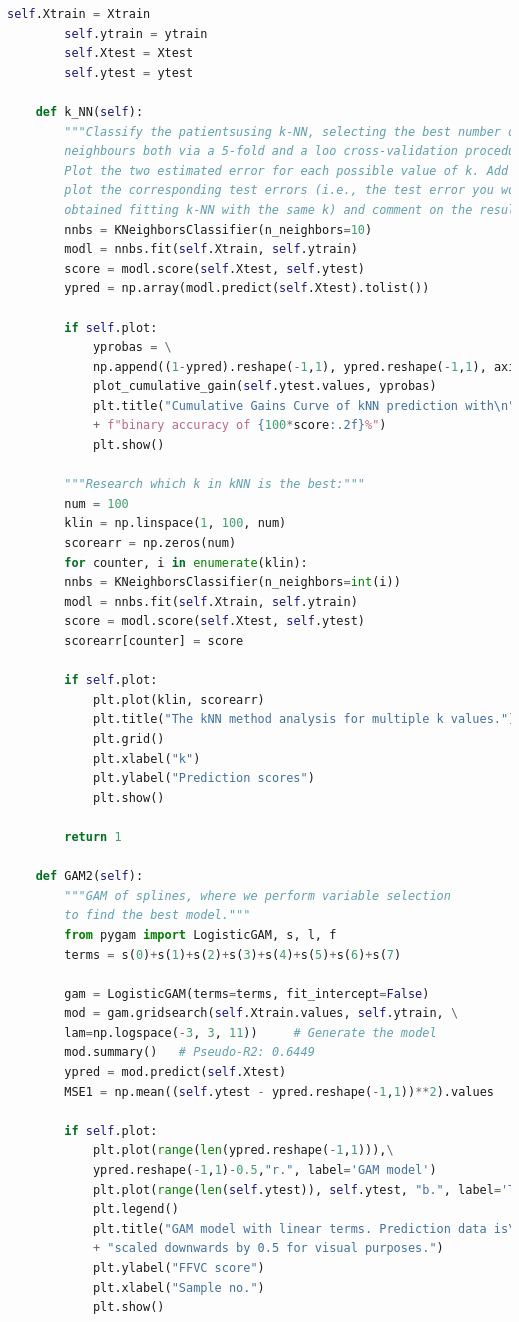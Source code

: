 \documentclass[]{article}
\begin{document}
\begin{lstlisting}[language=Python]
		self.Xtrain = Xtrain
		self.ytrain = ytrain
		self.Xtest = Xtest
		self.ytest = ytest
		
	def k_NN(self):
		"""Classify the patientsusing k-NN, selecting the best number of
		neighbours both via a 5-fold and a loo cross-validation procedure.
		Plot the two estimated error for each possible value of k. Add to the
		plot the corresponding test errors (i.e., the test error you would have
		obtained fitting k-NN with the same k) and comment on the results."""
		nnbs = KNeighborsClassifier(n_neighbors=10)
		modl = nnbs.fit(self.Xtrain, self.ytrain)
		score = modl.score(self.Xtest, self.ytest)
		ypred = np.array(modl.predict(self.Xtest).tolist())
		
		if self.plot:
			yprobas = \
			np.append((1-ypred).reshape(-1,1), ypred.reshape(-1,1), axis=1)
			plot_cumulative_gain(self.ytest.values, yprobas)
			plt.title("Cumulative Gains Curve of kNN prediction with\n"\
			+ f"binary accuracy of {100*score:.2f}%")
			plt.show()
			
		"""Research which k in kNN is the best:"""
		num = 100
		klin = np.linspace(1, 100, num)
		scorearr = np.zeros(num)
		for counter, i in enumerate(klin):
		nnbs = KNeighborsClassifier(n_neighbors=int(i))
		modl = nnbs.fit(self.Xtrain, self.ytrain)
		score = modl.score(self.Xtest, self.ytest)
		scorearr[counter] = score
		
		if self.plot:
			plt.plot(klin, scorearr)
			plt.title("The kNN method analysis for multiple k values.")
			plt.grid()
			plt.xlabel("k")
			plt.ylabel("Prediction scores")
			plt.show()
			
		return 1
	
	def GAM2(self):
		"""GAM of splines, where we perform variable selection
		to find the best model."""
		from pygam import LogisticGAM, s, l, f
		terms = s(0)+s(1)+s(2)+s(3)+s(4)+s(5)+s(6)+s(7)
		
		gam = LogisticGAM(terms=terms, fit_intercept=False)
		mod = gam.gridsearch(self.Xtrain.values, self.ytrain, \
		lam=np.logspace(-3, 3, 11))     # Generate the model
		mod.summary()   # Pseudo-R2: 0.6449
		ypred = mod.predict(self.Xtest)
		MSE1 = np.mean((self.ytest - ypred.reshape(-1,1))**2).values
		
		if self.plot:
			plt.plot(range(len(ypred.reshape(-1,1))),\
			ypred.reshape(-1,1)-0.5,"r.", label='GAM model')
			plt.plot(range(len(self.ytest)), self.ytest, "b.", label='Testing Data')
			plt.legend()
			plt.title("GAM model with linear terms. Prediction data is\n"\
			+ "scaled downwards by 0.5 for visual purposes.")
			plt.ylabel("FFVC score")
			plt.xlabel("Sample no.")
			plt.show()
			

\end{lstlisting}
\end{document}
